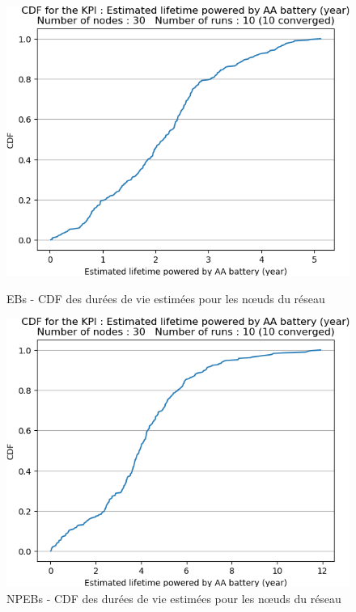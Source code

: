\documentclass[]{report}
\begin{document}
\begin{figure}[!ht]
	\begin{minipage}{0.49\textwidth}
		\centering
		\includegraphics[width=\textwidth]{results/EB/lifetime_AA_years.cdf}
		\caption{EBs - CDF des durées de vie estimées pour les nœuds du réseau}
		\label{fig:EBlifetime}
	\end{minipage}\hfill
	\begin{minipage}{0.5\textwidth}
		\centering
		\includegraphics[width=\textwidth]{results/NPEB/lifetime_AA_years.cdf}
		\caption{NPEBs - CDF des durées de vie estimées pour les nœuds du réseau}
		\label{fig:NPEBlifetime}
	\end{minipage}	
\end{figure}
\end{document}
